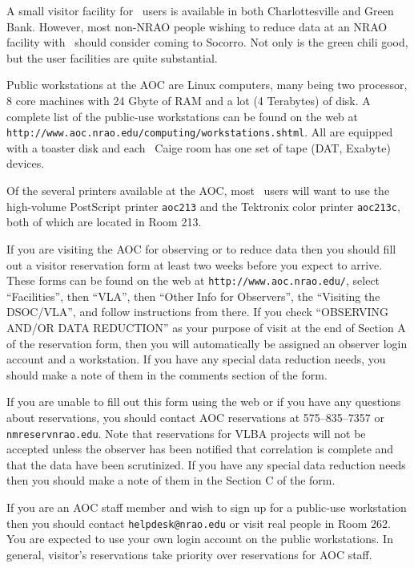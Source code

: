 
     A small visitor facility for \AIPS\ users is available in both
Charlottesville and Green Bank.  However, most non-NRAO people wishing
to reduce data at an NRAO facility with \AIPS\ should consider coming
to Socorro.  Not only is the green chili good, but the user facilities
are quite substantial.

    Public workstations at the AOC are Linux computers, many being two
processor, 8 core machines with 24 Gbyte of RAM and a lot (4
Terabytes) of disk.  A complete list of the public-use workstations
can be found on the web at {\tt
http://www.aoc.nrao.edu/computing/workstations.shtml}.  All are
equipped with a toaster disk and each \AIPS\ Caige room has one set of
tape (DAT, Exabyte) devices.

    Of the several printers available at the AOC, most \AIPS\ users
will want to use the high-volume PostScript printer {\tt aoc213} and
the Tektronix color printer {\tt aoc213c}, both of which are located
in Room 213.


    If you are visiting the AOC for observing or to reduce data then
you should fill out a visitor reservation form at least two weeks
before you expect to arrive. These forms can be found on the web at
{\tt http://www.aoc.nrao.edu/}, select ``Facilities'', then ``VLA'',
then ``Other Info for Observers'', the ``Visiting the DSOC/VLA'', and
follow instructions from there.  If you check ``OBSERVING AND/OR DATA
REDUCTION'' as your purpose of visit at the end of Section A of the
reservation form, then you will automatically be assigned an observer
login account and a workstation.  If you have any special data
reduction needs, you should make a note of them in the comments
section of the form.

    If you are unable to fill out this form using the web or if you
have any questions about reservations, you should contact AOC
reservations at 575--835--7357 or {\tt nmreserv\@ nrao.edu}.  Note
that reservations for VLBA projects will not be accepted unless the
observer has been notified that correlation is complete and that the
data have been scrutinized.  If you have any special data reduction
needs then you should make a note of them in the Section C of the
form.

    If you are an AOC staff member and wish to sign up for a public-use
workstation then you should contact {\tt helpdesk@nrao.edu} or visit
real people in Room 262.  You are expected to use your own login
account on the public workstations.  In general, visitor's
reservations take priority over reservations for AOC staff.

